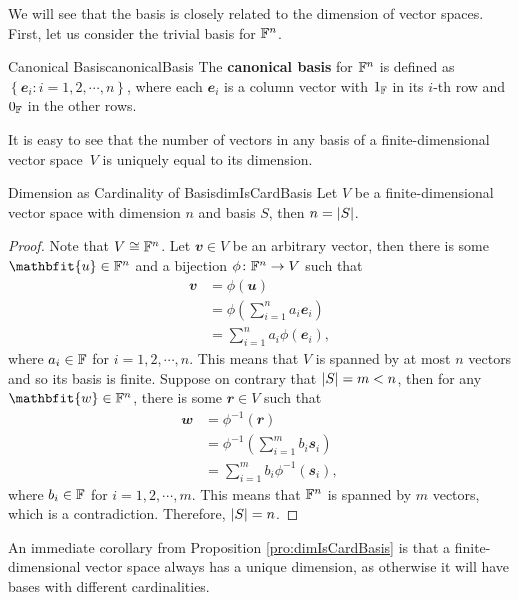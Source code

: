 \documentclass[math, code]{amznotes}
\theoremstyle{remark}
\begin{document}
We will see that the basis is closely related to the dimension of vector spaces. First, let us consider the trivial basis for $\mathbb{F}^n$.
\begin{dfnbox}{Canonical Basis}{canonicalBasis}
    The {\color{red} \textbf{canonical basis}} for $\mathbb{F}^n$ is defined as $\left\{\mathbfit{e}_i \colon i = 1, 2, \cdots, n\right\}$, where each $\mathbfit{e}_i$ is a column vector with $1_{\mathbb{F}}$ in its $i$-th row and $0_{\mathbb{F}}$ in the other rows.
\end{dfnbox}
It is easy to see that the number of vectors in any basis of a finite-dimensional vector space~$V$ is uniquely equal to its dimension.
\begin{probox}{Dimension as Cardinality of Basis}{dimIsCardBasis}
    Let $V$ be a finite-dimensional vector space with dimension $n$ and basis $S$, then $n = {\left\lvert {S} \right\rvert}$.
    \tcblower
    \begin{proof}
        Note that $V \cong \mathbb{F}^n$. Let $\mathbfit{v} \in V$ be an arbitrary vector, then there is some~$\mathbfit{u} \in \F^n$ and a bijection $\phi \colon \mathbb{F}^n \to V$ such that 
        \begin{align*}
            \mathbfit{v} & = \phi(\mathbfit{u}) \\
            & = \phi\left(\sum_{i = 1}^{n}a_i\mathbfit{e}_i\right) \\
            & = \sum_{i = 1}^{n}a_i\phi(\mathbfit{e}_i),
        \end{align*}
        where $a_i \in \mathbb{F}$ for $i = 1, 2, \cdots, n$. This means that $V$ is spanned by at most $n$ vectors and so its basis is finite. Suppose on contrary that ${\left\lvert {S} \right\rvert} = m < n$, then for any $\mathbfit{w} \in \F^n$, there is some $\mathbfit{r} \in V$ such that
        \begin{align*}
            \mathbfit{w} & = \phi^{-1}(\mathbfit{r}) \\
            & = \phi^{-1}\left(\sum_{i = 1}^{m}b_i\mathbfit{s}_i\right) \\
            & = \sum_{i = 1}^{m}b_i\phi^{-1}(\mathbfit{s}_i),
        \end{align*}
        where $b_i \in \mathbb{F}$ for $i = 1, 2, \cdots, m$. This means that $\mathbb{F}^n$ is spanned by $m$ vectors, which is a contradiction. Therefore, ${\left\lvert {S} \right\rvert} = n$.
    \end{proof}
\end{probox}
An immediate corollary from Proposition \ref{pro:dimIsCardBasis} is that a finite-dimensional vector space always has a unique dimension, as otherwise it will have bases with different cardinalities.
\end{document}
